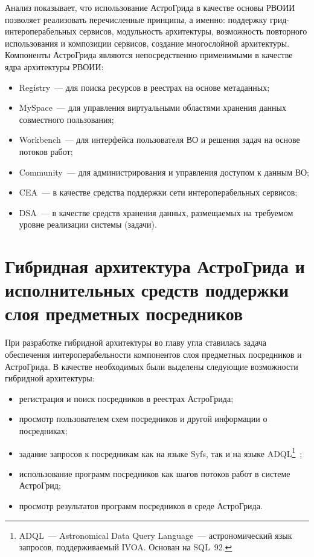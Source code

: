 \begin{multicols}{2}
     Анализ показывает, что использование АстроГрида в качестве основы РВОИИ
позволяет реализовать перечисленные принципы, а именно: поддержку
грид-ин\-тер\-опе\-ра\-бель\-ных сервисов, модульность архитектуры, возможность повторного
использования и композиции сервисов, создание многослойной архитектуры. Компоненты
АстроГрида являются непосредственно применимыми в качестве ядра архитектуры
РВОИИ:
     \begin{itemize}
\item Registry~--- для поиска ресурсов в реестрах на основе метаданных;
\item MySpace~--- для управления виртуальными областями хранения данных
совместного пользования;
\item Workbench~--- для интерфейса пользователя ВО и решения задач на основе
потоков работ;
\item Community~--- для администрирования и управ\-ле\-ния доступом к данным ВО;
\item CEA~--- в качестве средства поддержки сети интероперабельных сервисов;
\item DSA~--- в качестве средств хранения данных, размещаемых на требуемом уровне
реализации системы (задачи).
\end{itemize}

\section{Гибридная архитектура АстроГрида и исполнительных средств поддержки
слоя предметных посредников}

     При разработке гибридной архитектуры во главу угла ставилась задача обеспечения
интероперабельности компонентов слоя предметных посредников и АстроГрида.
     В качестве необходимых были выделены следующие возможности гибридной
архитектуры:
     \begin{itemize}
\item регистрация и поиск посредников в реестрах АстроГрида;\\[-14pt]
\item просмотр пользователем схем посредников и другой информации о посредниках;\\[-14pt]
\item задание запросов к посредникам как на языке Syfs, так и на языке
ADQL\footnote{ADQL~--- Astronomical Data Query Language~---
астрономический язык запросов, поддерживаемый IVOA.
Основан на SQL~92.}~\cite{Adql};\\[-14pt]
\item использование программ посредников как шагов потоков работ в системе
АстроГрид;\\[-14pt]
\item просмотр результатов программ посредников в среде АстроГрида.
\end{itemize}


\end{multicols}
